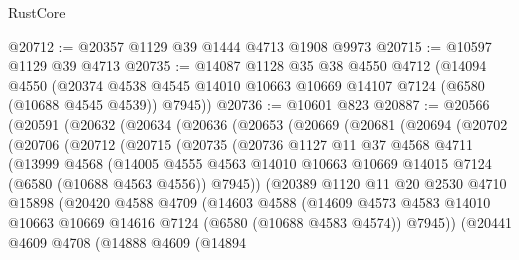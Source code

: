 \begin{lexlean}{RustCore}
\begin{coremodule}
@20712 := @20357 @1129 @39 @1444 @4713 @1908 @9973
@20715 := @10597 @1129 @39 @4713
@20735 := @14087
    @1128
    @35
    @38
    @4550
    @4712
    (@14094
      @4550
      (@20374 @4538 @4545 @14010 @10663 @10669 @14107 @7124 (@6580 (@10688 @4545 @4539)) @7945))
@20736 := @10601 @823
@20887 := @20566
    (@20591
      (@20632
        (@20634
          (@20636
            (@20653
              (@20669
                (@20681
                  (@20694
                    (@20702
                      (@20706
                        (@20712
                          (@20715
                            (@20735
                              (@20736
                                @1127
                                @11
                                @37
                                @4568
                                @4711
                                (@13999
                                  @4568
                                  (@14005
                                    @4555
                                    @4563
                                    @14010
                                    @10663
                                    @10669
                                    @14015
                                    @7124
                                    (@6580 (@10688 @4563 @4556))
                                    @7945))
                                (@20389
                                  @1120
                                  @11
                                  @20
                                  @2530
                                  @4710
                                  @15898
                                  (@20420
                                    @4588
                                    @4709
                                    (@14603
                                      @4588
                                      (@14609
                                        @4573
                                        @4583
                                        @14010
                                        @10663
                                        @10669
                                        @14616
                                        @7124
                                        (@6580 (@10688 @4583 @4574))
                                        @7945))
                                    (@20441
                                      @4609
                                      @4708
                                      (@14888
                                        @4609
                                        (@14894

\end{coremodule}
\end{lexlean}
